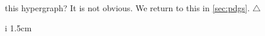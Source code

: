 \begin{subappendices}
    this hypergraph? It is not obvious.
    We return to this
      in \cref{sec:pdgs}. 
\hfill$\triangle$

\begin{wrapfigure}[5]{i}
        {1.5cm}
    \vspace{-1em}
    \centering
\end{wrapfigure}
\end{subappendices}
